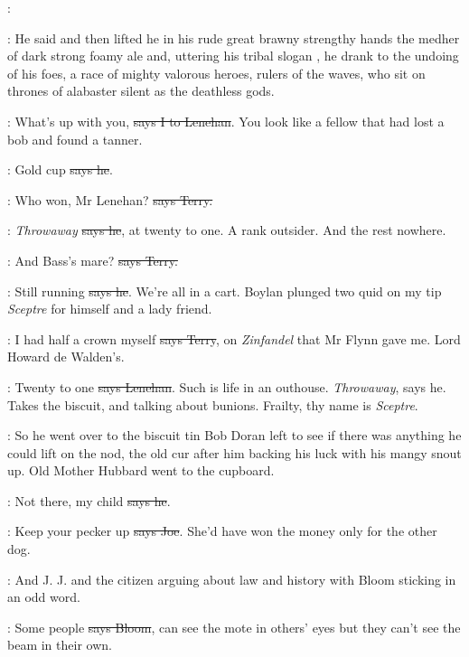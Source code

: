 \lenehan:

:
He said and then lifted he in his rude great brawny strengthy hands
the medher of dark strong foamy ale and, uttering his tribal slogan , he drank to the undoing of his foes, a race of mighty valorous
heroes, rulers of the waves, who sit on thrones of alabaster silent as the
deathless gods.

:
What's up with you, \sout{says I to Lenehan}.
You look like a fellow that had
lost a bob and found a tanner.

\lenehan:
Gold cup \sout{says he}.

\terry:
Who won, Mr Lenehan? \sout{says Terry.}

\lenehan:
\emph{Throwaway} \sout{says he}, at twenty to one.
A rank outsider. And the rest
nowhere.

\terry:
And Bass's mare? \sout{says Terry.}

\lenehan:
Still running \sout{says he}.
We're all in a cart. Boylan plunged two quid on
my tip \emph{Sceptre} for himself and a lady friend.

\terry:
I had half a crown myself \sout{says Terry},
on \emph{Zinfandel} that Mr Flynn gave
me. Lord Howard de Walden's.

\lenehan:
Twenty to one \sout{says Lenehan}.
Such is life in an outhouse. \emph{Throwaway},
says he. Takes the biscuit, and talking about bunions. Frailty, thy name
is \emph{Sceptre}.

\Nq:
So he went over to the biscuit tin Bob Doran left to see if there was
anything he could lift on the nod, the old cur after him backing his luck
with his mangy snout up. Old Mother Hubbard went to the cupboard.

\lenehan:
Not there, my child \sout{says he}.

\joe:
Keep your pecker up \sout{says Joe}.
She'd have won the money only for the
other dog.

\Nq:
And J. J. and the citizen arguing about law and history with Bloom
sticking in an odd word.

\Bloom:
Some people \sout{says Bloom},
can see the mote in others' eyes but they can't
see the beam in their own.

